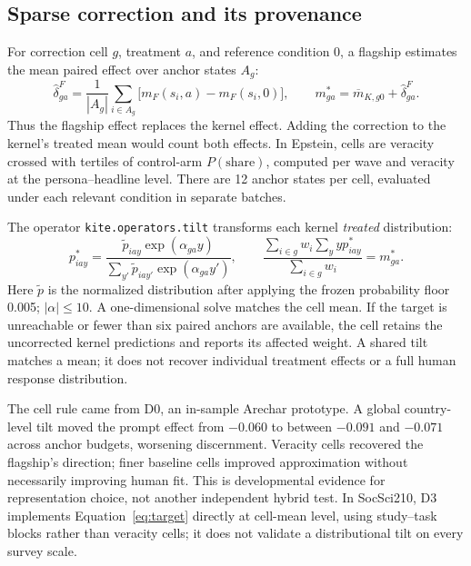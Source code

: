 \documentclass[11pt]{article}
\begin{document}
\subsection{Sparse correction and its provenance}
For correction cell $g$, treatment $a$, and reference condition $0$, a flagship estimates the mean paired effect over anchor states $A_g$:
\begin{equation}
\widehat\delta^F_{ga}=\frac{1}{|A_g|}\sum_{i\in A_g}\bigl[m_F(s_i,a)-m_F(s_i,0)\bigr],
\qquad m^*_{ga}=\overline m_{K,g0}+\widehat\delta^F_{ga}.
\label{eq:target}
\end{equation}
Thus the flagship effect replaces the kernel effect. Adding the correction to the kernel's treated mean would count both effects. In Epstein, cells are veracity crossed with tertiles of control-arm $P(\mathrm{share})$, computed per wave and veracity at the persona--headline level. There are 12 anchor states per cell, evaluated under each relevant condition in separate batches.

The operator \texttt{kite.operators.tilt} transforms each kernel \emph{treated} distribution:
\begin{equation}
p^*_{iay}=\frac{\widetilde p_{iay}\exp(\alpha_{ga}y)}{\sum_{y'}\widetilde p_{iay'}\exp(\alpha_{ga}y')},
\qquad \frac{\sum_{i\in g}w_i\sum_y yp^*_{iay}}{\sum_{i\in g}w_i}=m^*_{ga}.
\label{eq:tilt}
\end{equation}
Here $\widetilde p$ is the normalized distribution after applying the frozen probability floor 0.005; $|\alpha|\leq10$. A one-dimensional solve matches the cell mean. If the target is unreachable or fewer than six paired anchors are available, the cell retains the uncorrected kernel predictions and reports its affected weight. A shared tilt matches a mean; it does not recover individual treatment effects or a full human response distribution.

The cell rule came from D0, an in-sample Arechar prototype. A global country-level tilt moved the prompt effect from $-0.060$ to between $-0.091$ and $-0.071$ across anchor budgets, worsening discernment. Veracity cells recovered the flagship's direction; finer baseline cells improved approximation without necessarily improving human fit. This is developmental evidence for representation choice, not another independent hybrid test. In SocSci210, D3 implements Equation~\ref{eq:target} directly at cell-mean level, using study--task blocks rather than veracity cells; it does not validate a distributional tilt on every survey scale.
\end{document}
